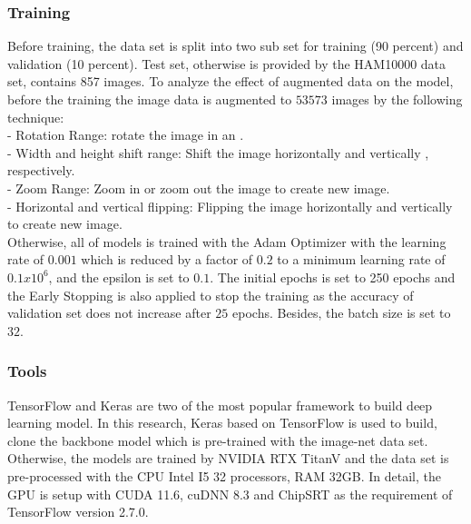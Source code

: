 \documentclass[sensors,article,submit,pdftex,moreauthors]{Definitions/mdpi}
\begin{document}
\subsubsection{Training}
Before training, the data set is split into two sub set for training (90 percent) and validation (10 percent). Test set, otherwise is provided by the HAM10000 data set, contains 857 images. To analyze the effect of augmented data on the model, before the training the image data is augmented to $53573$ images by the following technique:\\
- Rotation Range: rotate the image in an . \\
- Width and height shift range: Shift the image horizontally and vertically , respectively. \\
- Zoom Range:  Zoom in or zoom out the image  to create new image. \\
- Horizontal and vertical flipping: Flipping the image horizontally and vertically to create new image.\\
Otherwise, all of models is trained with the Adam Optimizer \cite{6980} with the learning rate of $0.001$ which is reduced by a factor of $0.2$ to a minimum learning rate of $0.1 x 10^6$, and the epsilon is set to $0.1$. The initial epochs is set to 250 epochs and the Early Stopping is also applied to stop the training as the accuracy of validation set does not increase after $25$ epochs. Besides, the batch size is set to $32$.

\subsubsection{Tools}
TensorFlow and Keras are two of the most popular framework to build deep learning model. In this research, Keras based on TensorFlow is used to build, clone the backbone model which is pre-trained with the image-net data set. Otherwise, the models are trained by NVIDIA RTX TitanV and the data set is pre-processed with the CPU Intel I5 32 processors, RAM 32GB. In detail, the GPU is setup with CUDA 11.6, cuDNN 8.3 and ChipSRT as the requirement of TensorFlow version 2.7.0.
\end{document}
